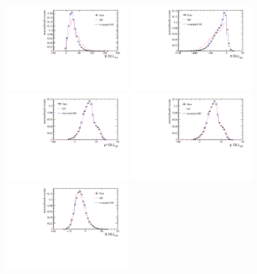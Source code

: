 \begin{figure}[!htb]
 \centering
 \includegraphics[width=0.49\textwidth]{figs/kpimm/data-mc/resampling/K_PIDK.pdf}
 \includegraphics[width=0.49\textwidth]{figs/kpimm/data-mc/resampling/Pi_PIDK.pdf}
 \includegraphics[width=0.49\textwidth]{figs/kpimm/data-mc/resampling/Muplus_PIDmu.pdf}
 \includegraphics[width=0.49\textwidth]{figs/kpimm/data-mc/resampling/Muminus_PIDmu.pdf}
 \includegraphics[width=0.49\textwidth]{figs/kpimm/data-mc/resampling/K_PIDmu.pdf}

\end{figure}
